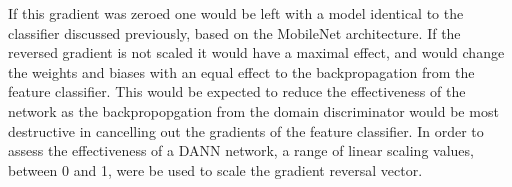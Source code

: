 If this gradient was zeroed one would be left with a model identical to the classifier discussed previously, based on the MobileNet architecture. If the reversed gradient is not scaled it would have a maximal effect, and would change the weights and biases with an equal effect to the backpropagation from the feature classifier. This would be expected to reduce the effectiveness of the network as the backpropopgation from the domain discriminator would be most destructive in cancelling out the gradients of the feature classifier. In order to assess the effectiveness of a DANN network, a range of linear scaling values, between 0 and 1, were be used to scale the gradient reversal vector.  


